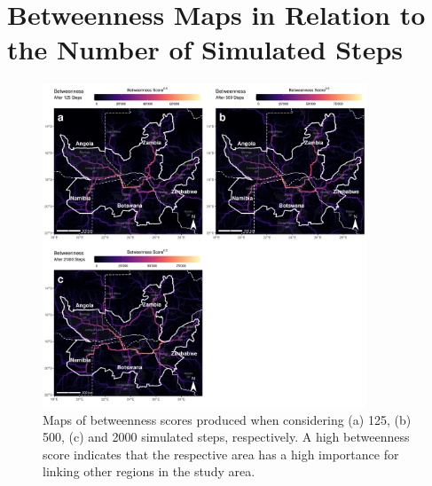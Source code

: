 \documentclass[abstract=off,10pt,a4paper,bibliography=totocnumbered]{article}
\begin{document}
\newpage
{}
\section{Betweenness Maps in Relation to the Number of Simulated Steps}
\begin{figure}[hbtp]
 \begin{center}
  \includegraphics[width = 0.86\textwidth]{99_BetweennessIndividual.png}
  \caption{Maps of betweenness scores produced when considering (a) 125, (b)
   500, (c) and 2000 simulated steps, respectively. A high betweenness score
   indicates that the respective area has a high importance for linking other
   regions in the study area.}
  \label{Betweenness}
 \end{center}
\end{figure}
\restoregeometry

\newpage
\end{document}
